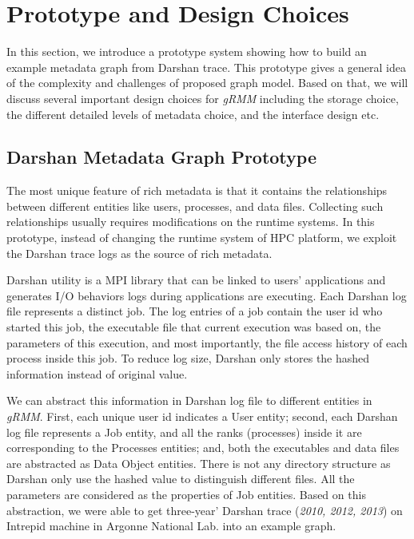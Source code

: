 \section{Prototype and Design Choices}

In this section, we introduce a prototype system showing how to build an example metadata graph from Darshan trace. This prototype gives a general idea of the complexity and challenges of proposed graph model. Based on that, we will discuss several important design choices for \textit{gRMM} including the storage choice, the different detailed levels of metadata choice, and the interface design etc. 

\subsection{Darshan Metadata Graph Prototype}
The most unique feature of rich metadata is that it contains the relationships between different entities like users, processes, and data files. Collecting such relationships usually requires modifications on the runtime systems. In this prototype, instead of changing the runtime system of HPC platform, we exploit the Darshan trace logs as the source of rich metadata.

Darshan utility is a MPI library that can be linked to users' applications and generates I/O behaviors logs during applications are executing. Each Darshan log file represents a distinct job. The log entries of a job contain the user id who started this job, the executable file that current execution was based on, the parameters of this execution, and most importantly, the file access history of each process inside this job. To reduce log size, Darshan only stores the hashed information instead of original value.

We can abstract this information in Darshan log file to different entities in \textit{gRMM}. First, each unique user id indicates a User entity; second, each Darshan log file represents a Job entity, and all the ranks (processes) inside it are corresponding to the Processes entities; and, both the executables and data files are abstracted as Data Object entities. There is not any directory structure as Darshan only use the hashed value to distinguish different files. All the parameters are considered as the properties of Job entities. Based on this abstraction, we were able to get three-year' Darshan trace (\textit{2010, 2012, 2013}) on Intrepid machine in Argonne National Lab. into an example graph. 

